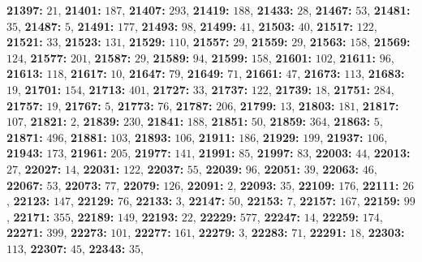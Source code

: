 \textsf{\bfseries 21397:} $21$, \textsf{\bfseries 21401:} $187$, \textsf{\bfseries 21407:} $293$, \textsf{\bfseries 21419:} $188$, \textsf{\bfseries 21433:} $28$, \textsf{\bfseries 21467:} $53$, \textsf{\bfseries 21481:} $35$, \textsf{\bfseries 21487:} $5$, \textsf{\bfseries 21491:} $177$, \textsf{\bfseries 21493:} $98$, \textsf{\bfseries 21499:} $41$, \textsf{\bfseries 21503:} $40$, \textsf{\bfseries 21517:} $122$, \textsf{\bfseries 21521:} $33$, \textsf{\bfseries 21523:} $131$, \textsf{\bfseries 21529:} $110$, \textsf{\bfseries 21557:} $29$, \textsf{\bfseries 21559:} $29$, \textsf{\bfseries 21563:} $158$, \textsf{\bfseries 21569:} $124$, \textsf{\bfseries 21577:} $201$, \textsf{\bfseries 21587:} $29$, \textsf{\bfseries 21589:} $94$, \textsf{\bfseries 21599:} $158$, \textsf{\bfseries 21601:} $102$, \textsf{\bfseries 21611:} $96$, \textsf{\bfseries 21613:} $118$, \textsf{\bfseries 21617:} $10$, \textsf{\bfseries 21647:} $79$, \textsf{\bfseries 21649:} $71$, \textsf{\bfseries 21661:} $47$, \textsf{\bfseries 21673:} $113$, \textsf{\bfseries 21683:} $19$, \textsf{\bfseries 21701:} $154$, \textsf{\bfseries 21713:} $401$, \textsf{\bfseries 21727:} $33$, \textsf{\bfseries 21737:} $122$, \textsf{\bfseries 21739:} $18$, \textsf{\bfseries 21751:} $284$, \textsf{\bfseries 21757:} $19$, \textsf{\bfseries 21767:} $5$, \textsf{\bfseries 21773:} $76$, \textsf{\bfseries 21787:} $206$, \textsf{\bfseries 21799:} $13$, \textsf{\bfseries 21803:} $181$, \textsf{\bfseries 21817:} $107$, \textsf{\bfseries 21821:} $2$, \textsf{\bfseries 21839:} $230$, \textsf{\bfseries 21841:} $188$, \textsf{\bfseries 21851:} $50$, \textsf{\bfseries 21859:} $364$, \textsf{\bfseries 21863:} $5$, \textsf{\bfseries 21871:} $496$, \textsf{\bfseries 21881:} $103$, \textsf{\bfseries 21893:} $106$, \textsf{\bfseries 21911:} $186$, \textsf{\bfseries 21929:} $199$, \textsf{\bfseries 21937:} $106$, \textsf{\bfseries 21943:} $173$, \textsf{\bfseries 21961:} $205$, \textsf{\bfseries 21977:} $141$, \textsf{\bfseries 21991:} $85$, \textsf{\bfseries 21997:} $83$, \textsf{\bfseries 22003:} $44$, \textsf{\bfseries 22013:} $27$, \textsf{\bfseries 22027:} $14$, \textsf{\bfseries 22031:} $122$, \textsf{\bfseries 22037:} $55$, \textsf{\bfseries 22039:} $96$, \textsf{\bfseries 22051:} $39$, \textsf{\bfseries 22063:} $46$, \textsf{\bfseries 22067:} $53$, \textsf{\bfseries 22073:} $77$, \textsf{\bfseries 22079:} $126$, \textsf{\bfseries 22091:} $2$, \textsf{\bfseries 22093:} $35$, \textsf{\bfseries 22109:} $176$, \textsf{\bfseries 22111:} $26$, \textsf{\bfseries 22123:} $147$, \textsf{\bfseries 22129:} $76$, \textsf{\bfseries 22133:} $3$, \textsf{\bfseries 22147:} $50$, \textsf{\bfseries 22153:} $7$, \textsf{\bfseries 22157:} $167$, \textsf{\bfseries 22159:} $99$, \textsf{\bfseries 22171:} $355$, \textsf{\bfseries 22189:} $149$, \textsf{\bfseries 22193:} $22$, \textsf{\bfseries 22229:} $577$, \textsf{\bfseries 22247:} $14$, \textsf{\bfseries 22259:} $174$, \textsf{\bfseries 22271:} $399$, \textsf{\bfseries 22273:} $101$, \textsf{\bfseries 22277:} $161$, \textsf{\bfseries 22279:} $3$, \textsf{\bfseries 22283:} $71$, \textsf{\bfseries 22291:} $18$, \textsf{\bfseries 22303:} $113$, \textsf{\bfseries 22307:} $45$, \textsf{\bfseries 22343:} $35$, 
